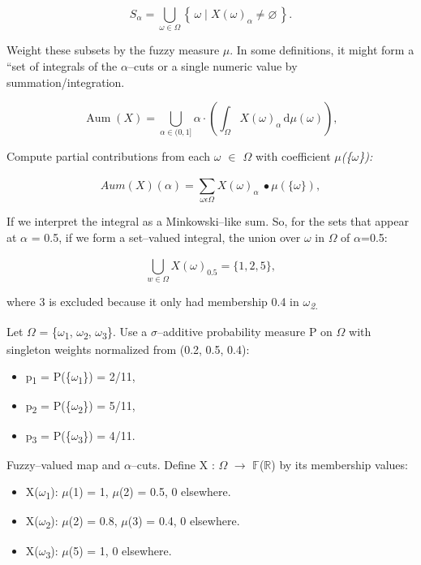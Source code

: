 \documentclass[12pt,a4paper]{report}
\numberwithin{equation}{section}
\begin{document}
\[
S_{\alpha}
= \bigcup_{\omega\in\Omega}\left\{\,\omega \mid X(\omega)_{\alpha}\neq \varnothing\,\right\}.
\]


Weight these subsets by the fuzzy measure $\mu$. In some definitions, it
might form a ``set of integrals of the $\alpha$--cuts or a single numeric value
by summation/integration.

\[
\operatorname{Aum}(X)
= \bigcup_{\alpha\in(0,1]}\alpha\cdot\left(\int_{\Omega} X(\omega)_{\alpha}\,\mathrm{d}\mu(\omega)\right),
\]


Compute partial contributions from each \emph{$\omega$ $\in$ $\Omega$} with coefficient
\emph{$\mu$(\{$\omega$\}):}

\[Aum(X)(\alpha) = \sum_{\omega\epsilon\Omega}^{}{X(\omega)_{\alpha}\  \bullet \mu\left( \{\omega\} \right),}\]

If we interpret the integral as a Minkowski--like sum. So, for the sets
that appear at \emph{$\alpha$} = 0.5, if we form a set--valued integral, the
union over \emph{$\omega$} in \emph{$\Omega$} of \emph{$\alpha$}=0.5:

\[\bigcup_{w \in \Omega}^{}{X{(\omega)}_{0.5} = \{ 1,2,5\},}\]

where 3 is excluded because it only had membership 0.4 in
\emph{$\omega$\textsubscript{2.}}

Let $\Omega$ = \{$\omega$\textsubscript{1}, $\omega$\textsubscript{2}, $\omega$\textsubscript{3}\}. Use a $\sigma$--additive probability measure P on $\Omega$ with
singleton weights normalized from (0.2, 0.5, 0.4):

\begin{itemize}
\item
  p\textsubscript{1} = P(\{$\omega$\textsubscript{1}\}) = 2/11,
\item
  p\textsubscript{2} = P(\{$\omega$\textsubscript{2}\}) = 5/11,
\item
  p\textsubscript{3} = P(\{$\omega$\textsubscript{3}\}) = 4/11.
\end{itemize}

Fuzzy--valued map and $\alpha$--cuts. Define X : $\Omega$ $\rightarrow$ $\mathbb{F}$($\mathbb{R}$) by its membership
values:

\begin{itemize}
\item
  X($\omega$\textsubscript{1}): $\mu$(1) = 1, $\mu$(2) = 0.5, 0 elsewhere.
\item
  X($\omega$\textsubscript{2}): $\mu$(2) = 0.8, $\mu$(3) = 0.4, 0 elsewhere.
\item
  X($\omega$\textsubscript{3}): $\mu$(5) = 1, 0 elsewhere.
\end{itemize}
\end{document}
